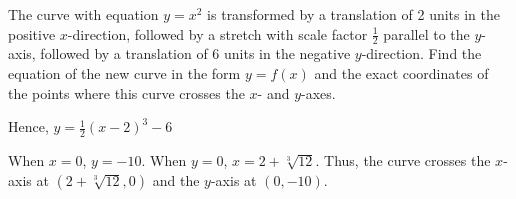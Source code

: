 \clearpage
\begin{problem}
    The curve with equation $y=x^2$ is transformed by a translation of 2 units in the positive $x$-direction, followed by a stretch with scale factor $\frac12$ parallel to the $y$-axis, followed by a translation of 6 units in the negative $y$-direction. Find the equation of the new curve in the form $y = f(x)$ and the exact coordinates of the points where this curve crosses the $x$- and $y$-axes.
\end{problem}
\begin{solution}
    \begin{center}
    \end{center}

    Hence, $y = \frac12 (x-2)^3 - 6$

    When $x=0$, $y = -10$. When $y = 0$, $x = 2 + \sqrt[3]{12}$. Thus, the curve crosses the $x$-axis at $(2 + \sqrt[3]{12}, 0)$ and the $y$-axis at $(0, -10)$.
\end{solution}

